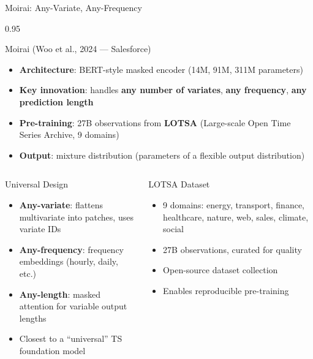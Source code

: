 \documentclass[9pt, aspectratio=169, t]{beamer}
\begin{document}
\begin{frame}{Moirai: Any-Variate, Any-Frequency}
    \begin{cminipage}{0.95\textwidth}
    \vspace{-0.3cm}
    {\scriptsize
    \begin{block}{Moirai (Woo et al., 2024 --- Salesforce)}
        \begin{itemize}\setlength{\itemsep}{0pt}
            \item \textbf{Architecture}: BERT-style masked encoder (14M, 91M, 311M parameters)
            \item \textbf{Key innovation}: handles \textbf{any number of variates}, \textbf{any frequency}, \textbf{any prediction length}
            \item \textbf{Pre-training}: 27B observations from \textbf{LOTSA} (Large-scale Open Time Series Archive, 9 domains)
            \item \textbf{Output}: mixture distribution (parameters of a flexible output distribution)
        \end{itemize}
    \end{block}
    \vspace{-2mm}
    \begin{columns}[T]
        \begin{exampleblock}{Universal Design}
            \begin{itemize}\setlength{\itemsep}{0pt}
                \item \textbf{Any-variate}: flattens multivariate into patches, uses variate IDs
                \item \textbf{Any-frequency}: frequency embeddings (hourly, daily, etc.)
                \item \textbf{Any-length}: masked attention for variable output lengths
                \item Closest to a ``universal'' TS foundation model
            \end{itemize}
        \end{exampleblock}

        \begin{alertblock}{LOTSA Dataset}
            \begin{itemize}\setlength{\itemsep}{0pt}
                \item 9 domains: energy, transport, finance, healthcare, nature, web, sales, climate, social
                \item 27B observations, curated for quality
                \item Open-source dataset collection
                \item Enables reproducible pre-training
            \end{itemize}
        \end{alertblock}
    \end{columns}
    }
    \end{cminipage}
\end{frame}
\end{document}
